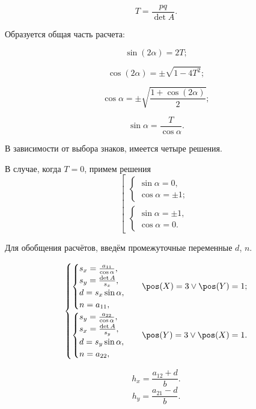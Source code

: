$$T = \frac{pq}{\det A}.$$

Образуется общая часть расчета:

$$\sin(2\alpha) = 2T;$$

$$\cos(2\alpha) = \pm \sqrt{1-4T^2};$$

$$\cos\alpha = \pm \sqrt{\frac{1 + \cos(2\alpha)}{2}};$$

$$\sin\alpha = \frac{T}{\cos\alpha}.$$

В зависимости от выбора знаков, имеется четыре решения.

В случае, когда $T=0$, примем решения
$$\left[ \begin{gathered}
\begin{cases}
	\sin\alpha = 0,\\
	\cos\alpha = \pm 1;
\end{cases}\\
\begin{cases}
	\sin\alpha = \pm 1,\\
	\cos\alpha = 0.
\end{cases}
\end{gathered}\right.$$

Для обобщения расчётов, введём промежуточные переменные $d$, $n$.

$$\begin{cases}
	\begin{cases}
		s_x = \frac{a_{11}}{\cos\alpha},\\
		s_y = \frac{\det A}{s_x},\\
		d = s_x \sin\alpha,\\
		n = a_{11},\\
	\end{cases} & \pos(X)=3 \vee \pos(Y)=1;\\
	\begin{cases}
		s_y = \frac{a_{22}}{\cos\alpha},\\
		s_x = \frac{\det A}{s_y},\\
		d = s_y \sin\alpha,\\
		n = a_{22},
	\end{cases} & \pos(Y)=3 \vee \pos(X) = 1.
\end{cases}$$


$$h_x = \frac{a_{12} + d}{b}.$$
$$h_y = \frac{a_{21} - d}{b}.$$

